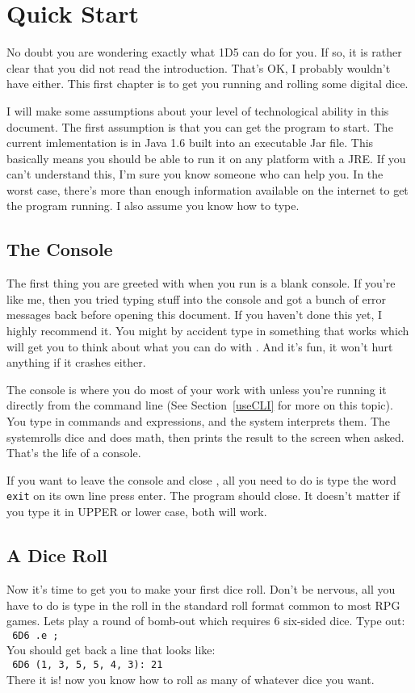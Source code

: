 \chapter{Quick Start}
\label{Quick Start}
No doubt you are wondering exactly what 1D5 can do for you.
If so, it is rather clear that you did not read the introduction. That's OK,
I probably wouldn't have either. This first chapter is to get you running and
rolling some digital dice.

I will make some assumptions about your level of technological ability in
this document. The first assumption is that you can get the program to start.
The current imlementation is in Java 1.6 built into an executable Jar file.
This basically means you should be able to run it on any platform with a JRE.
If you can't understand this, I'm sure you know someone who can help you.
In the worst case, there's more than enough information available on the
internet to get the program running. I also assume you know how to type.

\section{The Console}
\label{console}
The first thing you are greeted with when you run \progLogo is a blank console.
If you're like me, then you tried typing stuff into the console and got a
bunch of error messages back before opening this document. If you haven't
done this yet, I highly recommend it. You might by accident type in something
that works which will get you to think about what you can do with \progLogo.
And it's fun, it won't hurt anything if it crashes either.

The console is where you do most of your work with \progLogo unless you're
running it directly from the command line (See Section~\ref{useCLI} for more
on this topic). You type in commands and expressions, and the system
interprets them. The systemrolls dice and does math, then prints the result to
the screen when asked. That's the life of a console.

If you want to leave the console and close \progLogo, all you need to do is
type the word \texttt{ exit} on its own line press enter. The program should close.
It doesn't matter if you type it in UPPER or lower case, both will work.

\section{A Dice Roll}
\label{firstRoll}
Now it's time to get you to make your first dice roll. Don't be nervous, all
you have to do is type in the roll in the standard roll format common to most
RPG games. Lets play a round of bomb-out which requires 6 six-sided dice.
Type out:\\
\indent\texttt{ 6D6 .e ;}\\
You should get back a line that looks like:\\
\indent\texttt{ 6D6 (1, 3, 5, 5, 4, 3): 21}\\
There it is! now you know how to roll as many of whatever dice you want.

